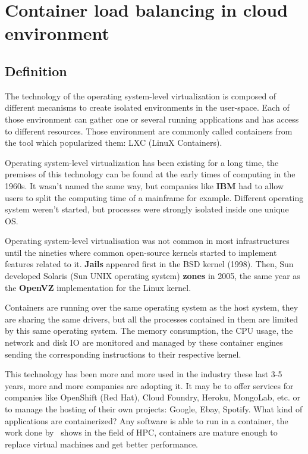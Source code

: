 \chapter{Container load balancing in cloud environment}
\label{mainidea}

\section{Definition}

The technology of the operating system-level virtualization is composed of
different mecanisms to create isolated environments in the user-space. Each of
those environment can gather one or several running applications and has access
to different resources. Those environment are commonly called containers from
the tool which popularized them: LXC (LinuX Containers).

Operating system-level virtualization has been existing for a long time, the
premises of this technology can be found at the early times of computing in the
1960s. It wasn't named the same way, but companies like \textbf{IBM} had to
allow users to split the computing time of a mainframe for example. Different
operating system weren't started, but processes were strongly isolated inside
one unique OS.

Operating system-level virtualisation was not common in most infrastructures
until the nineties where common open-source kernels started to implement
features related to it. \textbf{Jails} appeared first in the BSD kernel (1998).
Then, Sun developed Solaris (Sun UNIX operating system) \textbf{zones} in 2005,
the same year as the \textbf{OpenVZ} implementation for the Linux kernel.

Containers are running over the same operating system as the host system, they
are sharing the same drivers, but all the processes contained in them are
limited by this same operating system. The memory consumption, the CPU usage,
the network and disk IO are monitored and managed by these container engines
sending the corresponding instructions to their respective kernel. 

This technology has been more and more used in the industry these last 3-5
years, more and more companies are adopting it. It may be to offer services for
companies like OpenShift (Red Hat), Cloud Foundry, Heroku, MongoLab, etc. or to
manage the hosting of their own projects: Google, Ebay, Spotify. What kind of
applications are containerized? Any software is able to run in a container, the
work done by~\citet*{hpccontainers} shows in the field of HPC, containers are
mature enough to replace virtual machines and get better performance.

